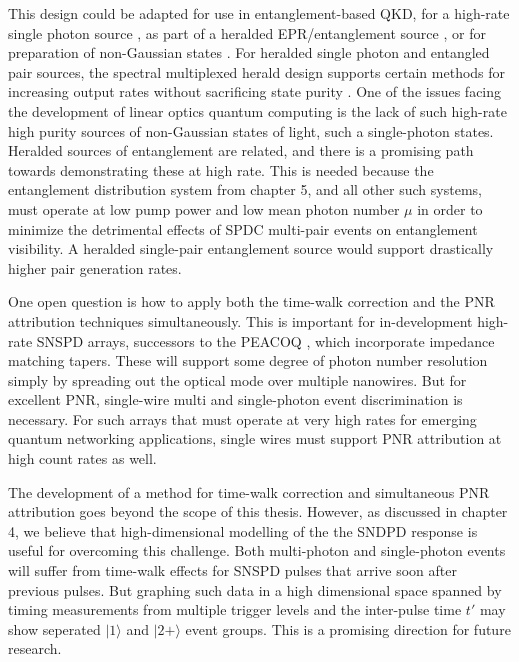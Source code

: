 \documentclass[11pt]{caltech_thesis} %
\begin{document}
This design could be adapted for use in entanglement-based QKD, for a high-rate single photon source \autocite{MeyerScott2020Single,MeyerScott2017,Andreas:12}, as part of a heralded EPR/entanglement source \autocite{barz2010heralded,barz2010heralded}, or for preparation of non-Gaussian states \autocite{Walschaers2021,AsavanantBook,Walschaers2021}. For heralded single photon and entangled pair sources, the spectral multiplexed herald design supports certain methods for increasing output rates without sacrificing state purity \autocite[\textcite{Grimau2017Heralded}]{Hiemstra2020}. One of the issues facing the development of linear optics quantum computing is the lack of such high-rate high purity sources of non-Gaussian states of light, such a single-photon states. Heralded sources of entanglement are related, and there is a promising path towards demonstrating these at high rate. This is needed because the entanglement distribution system from chapter 5, and all other such systems, must operate at low pump power and low mean photon number $\mu$ in order to minimize the detrimental effects of SPDC multi-pair events on entanglement visibility. A heralded single-pair entanglement source would support drastically higher pair generation rates.

One open question is how to apply both the time-walk correction and the PNR attribution techniques simultaneously. This is important for in-development high-rate SNSPD arrays, successors to the PEACOQ \autocite{Craiciu23}, which incorporate impedance matching tapers. These will support some degree of photon number resolution simply by spreading out the optical mode over multiple nanowires. But for excellent PNR, single-wire multi and single-photon event discrimination is necessary. For such arrays that must operate at very high rates for emerging quantum networking applications, single wires must support PNR attribution at high count rates as well.

The development of a method for time-walk correction and simultaneous PNR attribution goes beyond the scope of this thesis. However, as discussed in chapter 4, we believe that high-dimensional modelling of the the SNDPD response is useful for overcoming this challenge. Both multi-photon and single-photon events will suffer from time-walk effects for SNSPD pulses that arrive soon after previous pulses. But graphing such data in a high dimensional space spanned by timing measurements from multiple trigger levels and the inter-pulse time $t'$ may show seperated $|1\rangle$ and $|2+\rangle$ event groups. This is a promising direction for future research.
\end{document}
